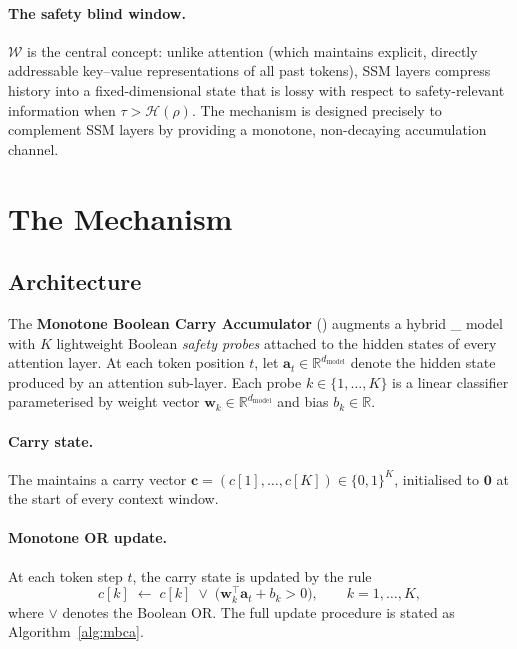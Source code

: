 \documentclass{article}
\newcommand{\piHybrid}{\pi_{\mathrm{hybrid}}}
\newcommand{\Horizon}{\mathcal{H}(\rho)}
\newcommand{\MBCA}{\mathrm{MBCA}}
\begin{document}
\paragraph{The safety blind window.}
$\mathcal{W}$ is the central concept: unlike attention (which maintains explicit, directly addressable key--value representations of all past tokens), SSM layers compress history into a fixed-dimensional state that is lossy with respect to safety-relevant information when $\tau > \Horizon$. The \MBCA{} mechanism is designed precisely to complement SSM layers by providing a monotone, non-decaying accumulation channel.



\section{The \MBCA{} Mechanism}
\label{sec:mbca}

\subsection{Architecture}
\label{sec:mbca:arch}

The \textbf{Monotone Boolean Carry Accumulator} (\MBCA{}) augments a hybrid
\piHybrid{} model with $K$ lightweight Boolean \emph{safety probes} attached to
the hidden states of every attention layer.  At each token position $t$, let
$\mathbf{a}_t \in \mathbb{R}^{d_{\mathrm{model}}}$ denote the hidden state
produced by an attention sub-layer.  Each probe $k \in \{1,\ldots,K\}$ is a
linear classifier parameterised by weight vector $\mathbf{w}_k \in
\mathbb{R}^{d_{\mathrm{model}}}$ and bias $b_k \in \mathbb{R}$.

\paragraph{Carry state.}
The \MBCA{} maintains a carry vector $\mathbf{c} = (c[1],\ldots,c[K]) \in
\{0,1\}^K$, initialised to $\mathbf{0}$ at the start of every context window.

\paragraph{Monotone OR update.}
At each token step $t$, the carry state is updated by the rule
\begin{equation}
  c[k] \;\leftarrow\; c[k] \;\vee\;
  \bigl(\mathbf{w}_k^{\top}\mathbf{a}_t + b_k > 0\bigr),
  \qquad k = 1,\ldots,K,
  \label{eq:mbca-update}
\end{equation}
where $\vee$ denotes the Boolean OR.  The full update procedure is stated as
Algorithm~\ref{alg:mbca}.
\end{document}
